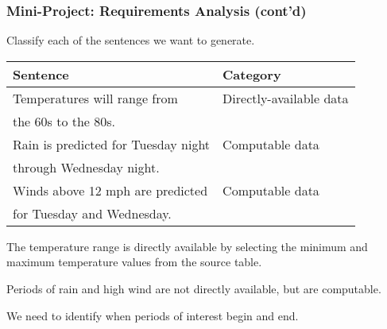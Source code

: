 \begin{frame}
\frametitle{Mini-Project: Requirements Analysis (cont'd)}

Classify each of the sentences we want to generate.

\vspace{12pt}

\begin{center}
	\begin{tabular}{|l|l|}
		\hline
		\textbf{Sentence} & \textbf{Category} \\
		\hline
		Temperatures will range from &  Directly-available data \\
		the 60s to the 80s.  & \\
		\hline
		Rain is predicted for Tuesday night  & Computable data \\
		through Wednesday night.  & \\
		\hline
		Winds above 12 mph are predicted  & Computable data \\
		for Tuesday and Wednesday.  & \\
		\hline
	\end{tabular}
\end{center}

\vspace{12pt}

The temperature range is directly available by selecting the minimum
and maximum temperature values from the source table.

\vspace{12pt}

Periods of rain and high wind are not directly available, but are computable.

We need to identify when periods of interest begin and end.

\end{frame}